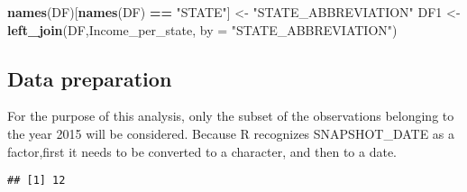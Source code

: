 \documentclass[]{article}
\newenvironment{Shaded}{\begin{snugshade}}{\end{snugshade}}
\newcommand{\KeywordTok}[1]{\textcolor[rgb]{0.13,0.29,0.53}{\textbf{#1}}}
\newcommand{\DataTypeTok}[1]{\textcolor[rgb]{0.13,0.29,0.53}{#1}}
\newcommand{\StringTok}[1]{\textcolor[rgb]{0.31,0.60,0.02}{#1}}
\newcommand{\OperatorTok}[1]{\textcolor[rgb]{0.81,0.36,0.00}{\textbf{#1}}}
\newcommand{\NormalTok}[1]{#1}
\begin{document}
\begin{Shaded}
\begin{Highlighting}[]
\KeywordTok{names}\NormalTok{(DF)[}\KeywordTok{names}\NormalTok{(DF) }\OperatorTok{==}\StringTok{ "STATE"}\NormalTok{] <-}\StringTok{ "STATE_ABBREVIATION"}
\NormalTok{DF1 <-}\StringTok{ }\KeywordTok{left_join}\NormalTok{(DF,Income_per_state, }\DataTypeTok{by =} \StringTok{"STATE_ABBREVIATION"}\NormalTok{)}
\end{Highlighting}
\end{Shaded}

\subsection{Data preparation}\label{data-preparation}

For the purpose of this analysis, only the subset of the observations
belonging to the year 2015 will be considered. Because R recognizes
SNAPSHOT\_DATE as a factor,first it needs to be converted to a
character, and then to a date.

\begin{Shaded}
\end{Shaded}

\begin{Shaded}
\end{Shaded}

\begin{verbatim}
## [1] 12
\end{verbatim}

\begin{Shaded}
\end{Shaded}
\end{document}
